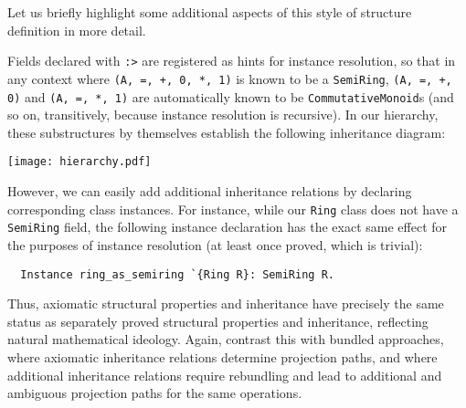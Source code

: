 \documentclass[a4paper,10pt,runningheads]{llncs}
\begin{document}
Let us briefly highlight some additional aspects of this style of structure definition in more detail.

Fields declared with \lstinline|:>| are registered as hints for instance resolution, so that in any context where \lstinline|(A, =, +, 0, *, 1)| is known to be a \lstinline|SemiRing|, \lstinline|(A, =, +, 0)| and \lstinline|(A, =, *, 1)| are automatically known to be \lstinline|CommutativeMonoid|s (and so on, transitively, because instance resolution is recursive). In our hierarchy, these substructures by themselves establish the following inheritance diagram:

\vspace{5mm}
\begin{center}
\texttt{[image: hierarchy.pdf]}
\end{center}
\vspace{5mm}


However, we can easily add additional inheritance relations by declaring corresponding class instances. For instance, while our \lstinline|Ring| class does not have a \lstinline|SemiRing| field, the following instance declaration has the exact same effect for the purposes of instance resolution (at least once proved, which is trivial):
\begin{lstlisting}
  Instance ring_as_semiring `{Ring R}: SemiRing R.
\end{lstlisting}

Thus, axiomatic structural properties and inheritance have precisely the same status as separately proved structural properties and inheritance, reflecting natural mathematical ideology. Again, contrast this with bundled approaches, where axiomatic inheritance relations determine projection paths, and where additional inheritance relations require rebundling and lead to additional and ambiguous projection paths for the same operations.

\end{document}
